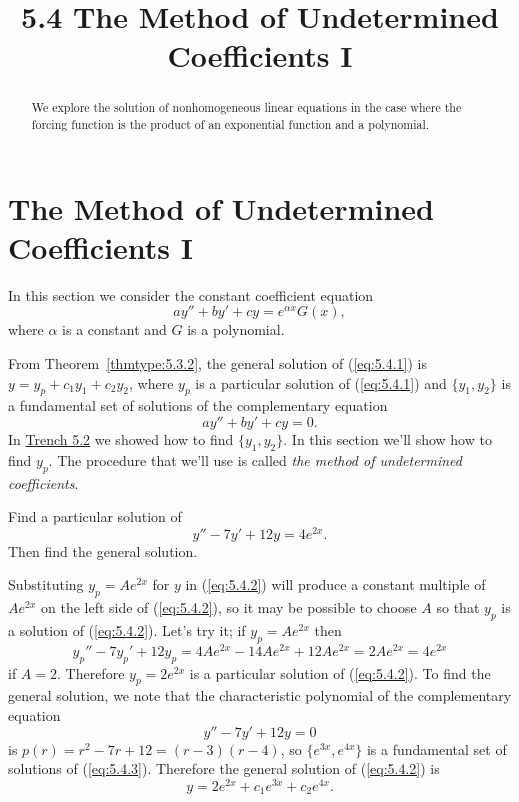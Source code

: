 \documentclass{ximera}
\title{5.4 The Method of Undetermined Coefficients I}
\begin{document}
 
\begin{abstract}
 We explore the solution of nonhomogeneous linear equations in the case where the forcing function is the product of an exponential function and a polynomial.
\end{abstract}
 
\maketitle
 
\section*{The Method of Undetermined Coefficients I}
 
In this section we consider the constant coefficient equation
\begin{equation} \label{eq:5.4.1}
ay''+by'+cy=e^{\alpha x}G(x),
\end{equation}
where $\alpha$ is a constant and $G$ is a polynomial.
 
 
From Theorem~\ref{thmtype:5.3.2}, the general solution of (\ref{eq:5.4.1})
is
$y=y_p+c_1y_1+c_2y_2$, where $y_p$ is a particular solution of
(\ref{eq:5.4.1}) and $\{y_1,y_2\}$ is a fundamental set of
solutions of the complementary equation
$$
ay''+by'+cy=0.
$$
In \href{https://ximera.osu.edu/ode/main/constantCoefficientHomogeneousEquations/constantCoefficientHomogeneousEquations}{Trench 5.2} we showed how to find $\{y_1,y_2\}$. In this
section we'll show how to find $y_p$. The procedure that we'll use
is called \textit{the method of undetermined coefficients}.
 
 
\begin{example}\label{example:5.4.1}
Find a particular solution of
\begin{equation} \label{eq:5.4.2}
y''-7y'+12y=4e^{2x}.
\end{equation}
Then find the general solution.
 
 
\begin{explanation}
Substituting $y_p=Ae^{2x}$ for $y$ in (\ref{eq:5.4.2}) will produce a
constant multiple of $Ae^{2x}$ on the left side of (\ref{eq:5.4.2}), so it
may be possible to choose $A$ so that $y_p$ is a solution of
(\ref{eq:5.4.2}). Let's try it;   if $y_p=Ae^{2x}$ then
$$
y_p''-7y_p'+12y_p=4Ae^{2x}-14Ae^{2x}+12Ae^{2x}=2Ae^{2x}=4e^{2x}
$$
if $A=2$. Therefore $y_p=2e^{2x}$ is a particular solution of
(\ref{eq:5.4.2}). To find the general solution, we note that the
characteristic polynomial of the complementary equation
\begin{equation} \label{eq:5.4.3}
y''-7y'+12y=0
\end{equation}
is $p(r)=r^2-7r+12=(r-3)(r-4)$, so $\{e^{3x},e^{4x}\}$ is a
fundamental set of solutions of (\ref{eq:5.4.3}). Therefore the general
solution of (\ref{eq:5.4.2}) is
$$
 y=2e^{2x}+c_1e^{3x}+c_2e^{4x}.
$$
 
\end{explanation}
\end{example}
 
\end{document}
